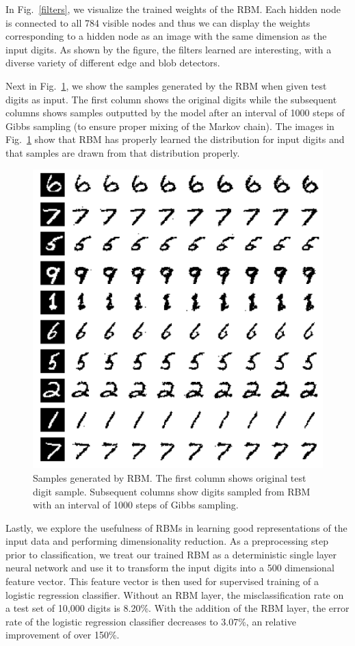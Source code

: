 \documentclass[journal]{IEEEtran}
\begin{document}
In Fig.~\ref{filters}, we visualize the trained weights of the RBM. Each hidden node is connected to all 784 visible nodes and thus we can display the weights corresponding to a hidden node as an image with the same dimension as the input digits. As shown by the figure, the filters learned are interesting, with a diverse variety of different edge and blob detectors. 

Next in Fig.~\ref{samples}, we show the samples generated by the RBM when given test digits as input. The first column shows the original digits while the subsequent columns shows samples outputted by the model after an interval of 1000 steps of Gibbs sampling (to ensure proper mixing of the Markov chain). The images in Fig.~\ref{samples} show that RBM has properly learned the distribution for input digits and that samples are drawn from that distribution properly. 

\begin{figure}[h]
  \centering
  \includegraphics[width=0.9\linewidth]{samples.png}
  \caption{Samples generated by RBM. The first column shows original test digit sample. Subsequent columns show digits sampled from RBM with an interval of 1000 steps of Gibbs sampling.}
  \label{samples}
\end{figure}

Lastly, we explore the usefulness of RBMs in learning good representations of the input data and performing dimensionality reduction. As a preprocessing step prior to classification, we treat our trained RBM as a deterministic single layer neural network and use it to transform the input digits into a 500 dimensional feature vector. This feature vector is then used for supervised training of a logistic regression classifier. Without an RBM layer, the misclassification rate on a test set of 10,000 digits is 8.20\%. With the addition of the RBM layer, the error rate of the logistic regression classifier decreases to 3.07\%, an relative improvement of over 150\%.
\end{document}
